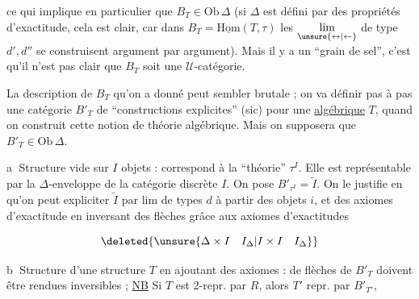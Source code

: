 ce qui implique en particulier que $B_T\in\mathrm{Ob}\,\Delta$ (si $\Delta$ est défini par des propriétés d'exactitude, cela est clair, car dans $B_T=\underline{\mathrm{Hom}}(T,\tau)$ les $\underset{\unsure{\leftrightarrow|\leftarrow}}{\lim}$ de type $d',d''$ se construisent argument par argument)\unsure{;|}. Mais il y a un ``grain de sel'', c'est qu'il n'est pas clair que $B_T$ soit une $\mathcal U$-catégorie.

La description de $B_T$ qu'on a donné peut sembler brutale ; on va définir pas à pas une catégorie $B'_T$ de ``constructions explicites'' (sic) pour une  \uline{algébrique} $T$, quand on construit cette notion de théorie algébrique. Mais on supposera que $B'_T\in\mathrm{Ob}\,\Delta$.

\textcircled{a} Structure vide sur $I$ objets : correspond à \deleted{\unsure{$\tau$}} la ``théorie'' $\tau^I$. Elle est représentable par la $\Delta$-enveloppe  de la catégorie discrète $I$.  On pose $B'_{\tau^{I}}=\widetilde I$. On le justifie  en  qu'on peut expliciter $\widetilde I$ par lim de types $d$ à partir des objets $i$, et des axiomes d'exactitude en inversant des flèches grâce aux axiomes d'exactitudes

\[
\deleted{\unsure{\Delta\times I\quad I_{\Delta}|I\times I\quad I_{\Delta}}}
\]

\textcircled{b} Structure  d'une structure $T$  en ajoutant des axiomes :  de flèches \inserted{$\Sigma$} de $B'_T$ doivent être rendues inversibles ;
\uline{NB} Si  $T$ est 2-repr. par $R$,  alors $T'$ repr. par  $B'_{T'}$, 

